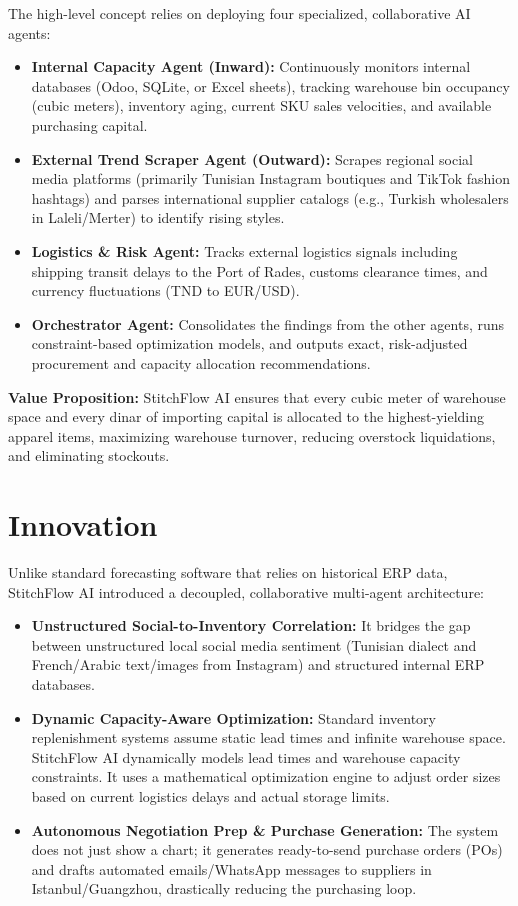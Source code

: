 \documentclass[11pt,a4paper]{article}
\begin{document}
The high-level concept relies on deploying four specialized, collaborative AI agents:
\begin{itemize}
    \item \textbf{Internal Capacity Agent (Inward):} Continuously monitors internal databases (Odoo, SQLite, or Excel sheets), tracking warehouse bin occupancy (cubic meters), inventory aging, current SKU sales velocities, and available purchasing capital.
    \item \textbf{External Trend Scraper Agent (Outward):} Scrapes regional social media platforms (primarily Tunisian Instagram boutiques and TikTok fashion hashtags) and parses international supplier catalogs (e.g., Turkish wholesalers in Laleli/Merter) to identify rising styles.
    \item \textbf{Logistics \& Risk Agent:} Tracks external logistics signals including shipping transit delays to the Port of Rades, customs clearance times, and currency fluctuations (TND to EUR/USD).
    \item \textbf{Orchestrator Agent:} Consolidates the findings from the other agents, runs constraint-based optimization models, and outputs exact, risk-adjusted procurement and capacity allocation recommendations.
\end{itemize}

\textbf{Value Proposition:} StitchFlow AI ensures that every cubic meter of warehouse space and every dinar of importing capital is allocated to the highest-yielding apparel items, maximizing warehouse turnover, reducing overstock liquidations, and eliminating stockouts.

\section{Innovation}
Unlike standard forecasting software that relies on historical ERP data, StitchFlow AI introduced a decoupled, collaborative multi-agent architecture:
\begin{itemize}
    \item \textbf{Unstructured Social-to-Inventory Correlation:} It bridges the gap between unstructured local social media sentiment (Tunisian dialect and French/Arabic text/images from Instagram) and structured internal ERP databases.
    \item \textbf{Dynamic Capacity-Aware Optimization:} Standard inventory replenishment systems assume static lead times and infinite warehouse space. StitchFlow AI dynamically models lead times and warehouse capacity constraints. It uses a mathematical optimization engine to adjust order sizes based on current logistics delays and actual storage limits.
    \item \textbf{Autonomous Negotiation Prep \& Purchase Generation:} The system does not just show a chart; it generates ready-to-send purchase orders (POs) and drafts automated emails/WhatsApp messages to suppliers in Istanbul/Guangzhou, drastically reducing the purchasing loop.
\end{itemize}
\end{document}
